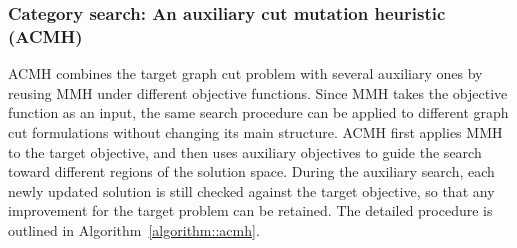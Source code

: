 \documentclass[12pt, a4paper]{article}%
\DeclareMathOperator*{\opt}{\ensuremath{opt}}
\numberwithin{equation}{section}
\theoremstyle{plain}
\begin{document}
			
			
			\subsubsection{Category search: An auxiliary cut mutation heuristic (ACMH)}
			\label{sec::cut-combined}

            {ACMH combines the target graph cut problem with several auxiliary ones by
reusing MMH under different objective functions. Since MMH takes the objective
function as an input, the same search procedure can be applied to different
graph cut formulations without changing its main structure. ACMH first applies
MMH to the target objective, and then uses auxiliary objectives to guide the
search toward different regions of the solution space. During the auxiliary
search, each newly updated solution is still checked against the target
objective, so that any improvement for the target problem can be retained. The
detailed procedure is outlined in Algorithm~\ref{algorithm::acmh}.}
			
			
			
\end{document}
